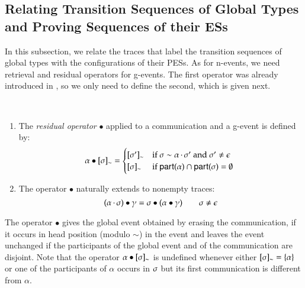 
%

\subsection{Relating Transition Sequences of Global Types and Proving
  Sequences of their ESs}\label{bullets}

 In this subsection, we relate the traces that label the
transition sequences of global types with the configurations of their
PESs.  As for n-events, we need retrieval and residual operators
for g-events. The first  operator was already introduced in
, so we only need to define the second, which is
given next. 


\begin{definition}\text{~}\\[-10pt]
\begin{enumerate} 
\item{}  The {\em  residual operator} $\bullet$ applied to a 
communication  and  a g-event is defined by:   
\[
\postG{\eqclass\comseq}{{\alpha}}=\begin{cases}
 \eqclass{\comseq'}      & \text{if }  \comseq\sim\concat{\alpha}{\comseq'}\text { and } \comseq'\neq\emptyseq\\
 \eqclass{\comseq}    & \text{if  $\participant{\alpha}
   \cap \participant{\comseq} = \emptyset$ } 
\end{cases}
   \]
\item{} The operator %
$\bullet$ naturally extends to 
nonempty
traces: 
\[
{(\alpha\,{\cdot}\,\sigma)}\bullet{\ensuremath{\gamma}}={\sigma}\bullet{(\ensuremath{{\alpha}\bullet{\ensuremath{\gamma}}})} \qquad  \sigma\not=\epsilon
\]
  \end{enumerate}
\end{definition} 

 The operator $\bullet$
gives the global event obtained by erasing the
communication,  if it occurs in head position (modulo
$\sim$) in  
the event and leaves the event unchanged if the participants of the global event and of the communication are disjoint. 
Note that the  operator
${\alpha}\bullet{\ensuremath{[\sigma]_{\sim}}}$ is undefined whenever either 
$[\sigma]_{\sim}=\{\alpha\}$ or  
 one of the participants of $\alpha$ occurs in $\sigma$
but its first communication is different from $\alpha$. 

